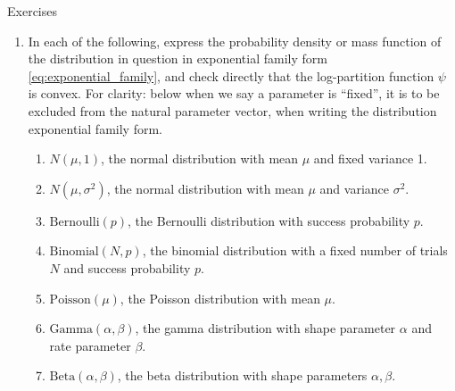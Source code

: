 \begin{xcb}{Exercises}
\begin{enumerate}[label=\thechapter.\arabic*]
\begin{enumerate}[label=\alph*.]
\item Show that $\dom(\psi)$ is a convex set. Hint: use part a.

\item Show that $\psi$ is twice differentiable. Hint: use part a, then use 
  the Leibniz integral rule to interchange differentiation and integration. 

\item Show that $\nabla^2 \psi$ is positive semidefinite everywhere, and
  conclude that $\psi$ is convex. 
\end{enumerate}

\item \label{ex:exponential_family_examples} 
  In each of the following, express the probability density or mass function of
  the distribution in question in exponential family form
  \eqref{eq:exponential_family}, and check directly that the log-partition
  function $\psi$ is convex. For clarity: below when we say a parameter is 
  ``fixed'', it is to be excluded from the natural parameter vector, when
  writing the distribution exponential family form.     

\begin{enumerate}[label=\alph*.]
\item $N(\mu,1)$, the normal distribution with mean $\mu$ and fixed variance 1. 

\item $N(\mu, \sigma^2)$, the normal distribution with mean $\mu$ and variance 
  $\sigma^2$. 

\item $\mathrm{Bernoulli}(p)$, the Bernoulli distribution with success
  probability $p$. 

\item $\mathrm{Binomial}(N, p)$, the binomial distribution with a fixed number
  of trials $N$ and success probability $p$.

\item $\mathrm{Poisson}(\mu)$, the Poisson distribution with mean $\mu$.

\item $\mathrm{Gamma}(\alpha, \beta)$, the gamma distribution with shape
  parameter $\alpha$ and rate parameter $\beta$. 

\item $\mathrm{Beta}(\alpha, \beta)$, the beta distribution with shape
  parameters $\alpha, \beta$.
\end{enumerate}


\end{enumerate}
\end{xcb}

